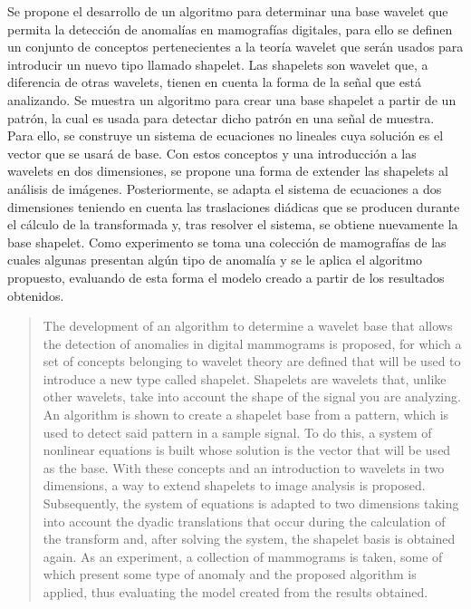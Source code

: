 \begin{resumen}
	\par Se propone el desarrollo de un algoritmo para determinar una base wavelet que permita la detección de anomalías en mamografías digitales, para ello se definen un conjunto de conceptos pertenecientes a la teoría wavelet que serán usados para introducir un nuevo tipo llamado shapelet. Las shapelets son wavelet que, a diferencia de otras wavelets, tienen en cuenta la forma de la señal que está analizando. Se muestra un algoritmo para crear una base shapelet a partir de un patrón, la cual es usada para detectar dicho patrón en una señal de muestra. Para ello, se construye un sistema de ecuaciones no lineales cuya solución es el vector que se usará de base. Con estos conceptos y una introducción a las wavelets en dos dimensiones, se propone una forma de extender las shapelets al análisis de imágenes. Posteriormente, se adapta el sistema de ecuaciones a dos dimensiones teniendo en cuenta las traslaciones diádicas que se producen durante el cálculo de la transformada y, tras resolver el sistema, se obtiene nuevamente la base shapelet. Como experimento se toma una colección de mamografías de las cuales algunas presentan algún tipo de anomalía y se le aplica el algoritmo propuesto, evaluando de esta forma el modelo creado a partir de los resultados obtenidos.
\end{resumen}

\begin{abstract}
	The development of an algorithm to determine a wavelet base that allows the detection of anomalies in digital mammograms is proposed, for which a set of concepts belonging to wavelet theory are defined that will be used to introduce a new type called shapelet. Shapelets are wavelets that, unlike other wavelets, take into account the shape of the signal you are analyzing. An algorithm is shown to create a shapelet base from a pattern, which is used to detect said pattern in a sample signal. To do this, a system of nonlinear equations is built whose solution is the vector that will be used as the base. With these concepts and an introduction to wavelets in two dimensions, a way to extend shapelets to image analysis is proposed. Subsequently, the system of equations is adapted to two dimensions taking into account the dyadic translations that occur during the calculation of the transform and, after solving the system, the shapelet basis is obtained again. As an experiment, a collection of mammograms is taken, some of which present some type of anomaly and the proposed algorithm is applied, thus evaluating the model created from the results obtained.
\end{abstract}